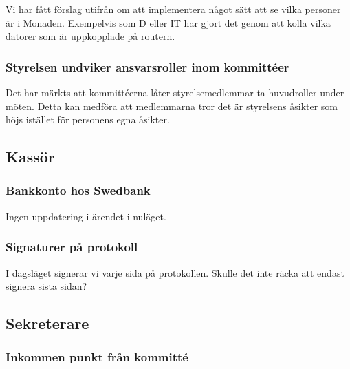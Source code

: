 \documentclass[protokoll]{dvd}
\begin{document}
Vi har fått förslag utifrån om att implementera något sätt att se vilka personer är i Monaden. Exempelvis som D eller IT har gjort det genom att kolla vilka datorer som är uppkopplade på routern.



\subsubsection{Styrelsen undviker ansvarsroller inom kommittéer}

Det har märkts att kommittéerna låter styrelsemedlemmar ta huvudroller under möten. Detta kan medföra att medlemmarna tror det är styrelsens åsikter som höjs istället för personens egna åsikter. 




\newpage

\subsection{Kassör}

\subsubsection{Bankkonto hos Swedbank}

\begin{description}[style=multiline, widest=00.00, align=left, leftmargin=2.5cm]
    \item[2021-10-11] Ingen uppdatering i ärendet i nuläget.
\end{description}


\subsubsection{Signaturer på protokoll}

I dagsläget signerar vi varje sida på protokollen. Skulle det inte räcka att endast signera sista sidan?




\newpage

\subsection{Sekreterare}

\subsubsection{Inkommen punkt från kommitté}
\end{document}
